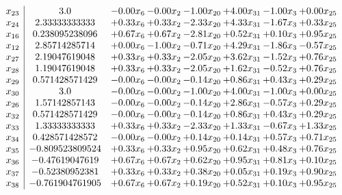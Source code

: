 \documentclass[8pt]{article}
\begin{document}
\[\begin{array}{c| c c@{\hskip 2pt} c@{\hskip 2pt} c@{\hskip 2pt} c@{\hskip 2pt} c@{\hskip 2pt} c@{\hskip 2pt} }
 x_{23}   &  3.0 & -0.00 x_{6} & -0.00 x_{2} & -1.00 x_{20} & +  4.00 x_{31} & -1.00 x_{3} & +  0.00 x_{25}\\
 x_{24}   &  2.33333333333 & +  0.33 x_{6} & +  0.33 x_{2} & -2.33 x_{20} & +  4.33 x_{31} & -1.67 x_{3} & +  0.33 x_{25}\\
 x_{16}   &  0.238095238096 & +  0.67 x_{6} & +  0.67 x_{2} & -2.81 x_{20} & +  0.52 x_{31} & +  0.10 x_{3} & +  0.95 x_{25}\\
 x_{12}   &  2.85714285714 & +  0.00 x_{6} & -1.00 x_{2} & -0.71 x_{20} & +  4.29 x_{31} & -1.86 x_{3} & -0.57 x_{25}\\
 x_{27}   &  2.19047619048 & +  0.33 x_{6} & +  0.33 x_{2} & -2.05 x_{20} & +  3.62 x_{31} & -1.52 x_{3} & +  0.76 x_{25}\\
 x_{28}   &  1.19047619048 & +  0.33 x_{6} & +  0.33 x_{2} & -2.05 x_{20} & +  1.62 x_{31} & -0.52 x_{3} & +  0.76 x_{25}\\
 x_{29}   &  0.571428571429 & -0.00 x_{6} & -0.00 x_{2} & -0.14 x_{20} & +  0.86 x_{31} & +  0.43 x_{3} & +  0.29 x_{25}\\
 x_{30}   &  3.0 & -0.00 x_{6} & -0.00 x_{2} & -1.00 x_{20} & +  4.00 x_{31} & -1.00 x_{3} & +  0.00 x_{25}\\
 x_{26}   &  1.57142857143 & -0.00 x_{6} & -0.00 x_{2} & -0.14 x_{20} & +  2.86 x_{31} & -0.57 x_{3} & +  0.29 x_{25}\\
 x_{32}   &  0.571428571429 & -0.00 x_{6} & -0.00 x_{2} & -0.14 x_{20} & +  0.86 x_{31} & +  0.43 x_{3} & +  0.29 x_{25}\\
 x_{33}   &  1.33333333333 & +  0.33 x_{6} & +  0.33 x_{2} & -2.33 x_{20} & +  1.33 x_{31} & -0.67 x_{3} & +  1.33 x_{25}\\
 x_{34}   &  0.428571428572 & -0.00 x_{6} & -0.00 x_{2} & +  0.14 x_{20} & +  0.14 x_{31} & +  0.57 x_{3} & +  0.71 x_{25}\\
 x_{35}   &  -0.809523809524 & +  0.33 x_{6} & +  0.33 x_{2} & +  0.95 x_{20} & +  0.62 x_{31} & +  0.48 x_{3} & +  0.76 x_{25}\\
 x_{36}   &  -0.47619047619 & +  0.67 x_{6} & +  0.67 x_{2} & +  0.62 x_{20} & +  0.95 x_{31} & +  0.81 x_{3} & +  0.10 x_{25}\\
 x_{37}   &  -0.52380952381 & +  0.33 x_{6} & +  0.33 x_{2} & +  0.38 x_{20} & +  0.05 x_{31} & +  0.19 x_{3} & +  0.90 x_{25}\\
 x_{38}   &  -0.761904761905 & +  0.67 x_{6} & +  0.67 x_{2} & +  0.19 x_{20} & +  0.52 x_{31} & +  0.10 x_{3} & +  0.95 x_{25}\\

\end{array}\]
\end{document}
